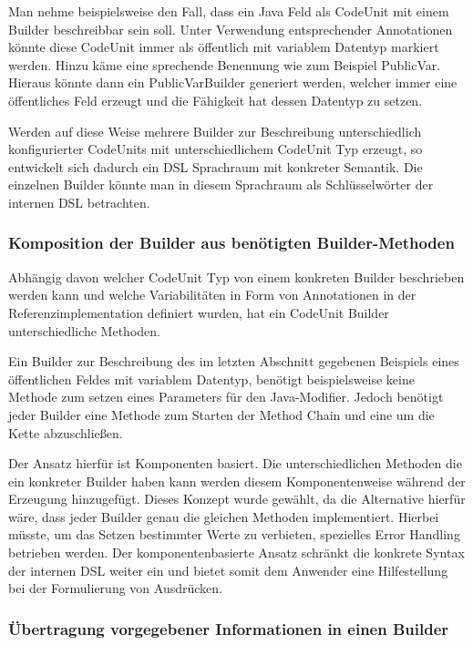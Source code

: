 \documentclass[12pt,oneside,a4paper,parskip]{scrbook}
\begin{document}
Man nehme beispielsweise den Fall, dass ein Java Feld als CodeUnit mit einem Builder beschreibbar sein soll. Unter Verwendung entsprechender Annotationen könnte diese CodeUnit immer als öffentlich mit variablem Datentyp markiert werden. Hinzu käme eine sprechende Benennung wie zum Beispiel PublicVar. Hieraus könnte dann ein PublicVarBuilder generiert werden, welcher immer eine öffentliches Feld erzeugt und die Fähigkeit hat dessen Datentyp zu setzen.

Werden auf diese Weise mehrere Builder zur Beschreibung unterschiedlich konfigurierter CodeUnits mit unterschiedlichem CodeUnit Typ erzeugt, so entwickelt sich dadurch ein DSL Sprachraum mit konkreter Semantik. Die einzelnen Builder könnte man in diesem Sprachraum als Schlüsselwörter der internen DSL betrachten.

\subsubsection{Komposition der Builder aus benötigten Builder-Methoden}

Abhängig davon welcher CodeUnit Typ von einem konkreten Builder beschrieben werden kann und welche Variabilitäten in Form von Annotationen in der Referenzimplementation definiert wurden, hat ein CodeUnit Builder unterschiedliche Methoden. 

Ein Builder zur Beschreibung des im letzten Abschnitt gegebenen Beispiels eines öffentlichen Feldes mit variablem Datentyp, benötigt beispielsweise keine Methode zum setzen eines Parameters für den Java-Modifier. Jedoch benötigt jeder Builder eine Methode zum Starten der Method Chain und eine um die Kette abzuschließen.

Der Ansatz hierfür ist Komponenten basiert. Die unterschiedlichen Methoden die ein konkreter Builder haben kann werden diesem Komponentenweise während der Erzeugung hinzugefügt. Dieses Konzept wurde gewählt, da die Alternative hierfür wäre, dass jeder Builder genau die gleichen Methoden implementiert. Hierbei müsste, um das Setzen bestimmter Werte zu verbieten, spezielles Error Handling betrieben werden. Der komponentenbasierte Ansatz schränkt die konkrete Syntax der internen DSL weiter ein und bietet somit dem Anwender eine Hilfestellung bei der Formulierung von Ausdrücken.

\subsubsection{Übertragung vorgegebener Informationen in einen Builder}
\end{document}
